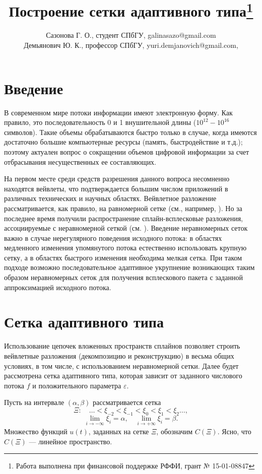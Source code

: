 \documentclass{spisok-article}
\title{Построение сетки адаптивного типа\thanks{Работа выполнена при финансовой поддержке РФФИ, грант № 15-01-08847}
}
\author{Сазонова Г. О., студент СПбГУ, galinasazo@gmail.com\\Демьянович Ю. К., профессор СПбГУ, yuri.demjanovich@gmail.com,}
\begin{document}
\maketitle

\section{Введение}
   В современном мире потоки информации имеют электронную форму.
   Как правило, это последовательность 0 и 1 внушительной длины
   ($10^{12} - 10^{16}$ символов). Такие объемы обрабатываются быстро
   только в случае, когда имеются достаточно большие компьютерные ресурсы
   (память, быстродействие и т.д.); поэтому актуален вопрос о сокращении
   объемов цифровой информации за счет отбрасывания несущественных
   ее составляющих.

   На первом месте среди средств разрешения данного вопроса
   несомненно находятся вейвлеты, что подтверждается большим числом
   приложений в различных технических и научных областях. Вейвлетное
   разложение рассматривается, как правило, на равномерной сетке
   (см., например, \cite{leb, ter}). Но за последнее время получили
   распространение сплайн-всплесковые  разложения, ассоциируемые с
   неравномерной сеткой (см. \cite{mall, dem}). Введение неравномерных
   сеток важно в случае нерегулярного поведения исходного потока: в
   областях медленного изменения упомянутого потока естественно
   использовать крупную сетку, а в областях быстрого изменения
   необходима мелкая сетка. При таком подходе возможно
   последовательное адаптивное укрупнение возникающих таким образом
   неравномерных сеток для получения всплескового пакета с заданной
   аппроксимацией исходного потока.
   \section{Сетка адаптивного типа}
    Использование цепочек вложенных пространств сплайнов позволяет
  строить вейвлетные разложения (декомпозицию и реконструкцию)
  в весьма общих условиях, в том числе, с использованием неравномерной
  сетки. Далее будет рассмотрена сетка адаптивного типа, которая
  зависит от заданного числового потока $f$ и положительного параметра
  $\varepsilon$.

  Пусть на интервале $(\alpha,\beta)$ рассматривается сетка
 $$\Xi:\quad
    \ldots<\xi_{-2}<\xi_{-1}<\xi_0<\xi_1<\xi_2\ldots, $$
    $$\lim_{i\to -\infty}\xi_i=\alpha,\quad \lim_{i\to
    +\infty}\xi_i=\beta.
            $$
    Множество функций $u(t)$, заданных на сетке $\Xi$, обозначим
    $C(\Xi)$. \linebreak Ясно, что  $C(\Xi)$ --- линейное пространство.
\end{document}
